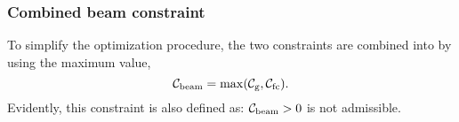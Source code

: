 \subsubsection{Combined beam constraint}
To simplify the optimization procedure, the two constraints are combined into by using the maximum value,
\begin{equation}
	\mathcal{C}_{\text{beam}} = \max ( \mathcal{C}_{\text{g}}, \mathcal{C}_{\text{fc}}).
\end{equation}
Evidently, this constraint is also defined as: $\mathcal{C}_{\text{beam}} > 0$ is not admissible.
